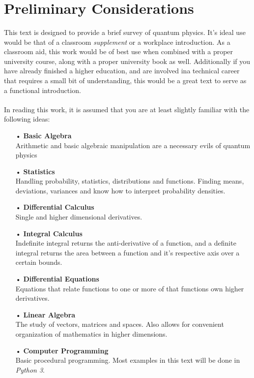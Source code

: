 \documentclass[12pt,letterpaper]{book}
\begin{document}

\section*{Preliminary Considerations}

\paragraph*{}This text is designed to provide a brief survey of quantum physics. It's ideal use would be that of a classroom \textit{supplement} or a workplace introduction. As a classroom aid, this work would be of best use when combined with a proper university course, along with a proper university book as well. Additionally if you have already finished a higher education, and are involved ina technical career that requires a small bit of understanding, this would be a great text to serve as a functional introduction.
\paragraph*{}In reading this work, it is assumed that you are at least slightly familiar with the following ideas:
\begin{enumerate}
\item[•]\textbf{Basic Algebra}\\
Arithmetic and basic algebraic manipulation are a necessary evils of quantum physics
\item[•]\textbf{Statistics}\\
Handling probability, statistics, distributions and functions. Finding means, deviations, variances and know how to interpret probability densities.
\item[•]\textbf{Differential Calculus}\\
Single and higher dimensional derivatives.
\item[•]\textbf{Integral Calculus}\\
Indefinite integral returns the anti-derivative of a function, and a definite integral returns the area between a function and it's respective axis over a certain bounds.
\item[•]\textbf{Differential Equations}\\
Equations that relate functions to one or more of that functions own higher derivatives.
\item[•]\textbf{Linear Algebra}\\
The study of vectors, matrices and spaces. Also allows for convenient organization of mathematics in higher dimensions.
\item[•]\textbf{Computer Programming}\\
Basic procedural programming. Most examples in this text will be done in \textit{Python 3}.
\end{enumerate}
\end{document}
